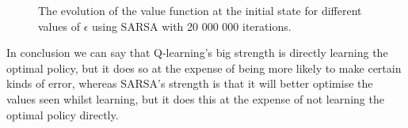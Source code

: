 \documentclass{article}
\begin{document}
\begin{figure}[H]
    \centering
    \caption{The evolution of the value function at the initial state for different values of $\epsilon$ using SARSA with 20 000 000 iterations.}
    \label{fig:q3-sarsa}
\end{figure}



In conclusion we can say that Q-learning's big strength is directly learning the optimal policy, but it does so at the expense of being more likely to make certain kinds of error, whereas SARSA's strength is that it will better optimise the values seen whilst learning, but it does this at the expense of not learning the optimal policy directly.
\end{document}
